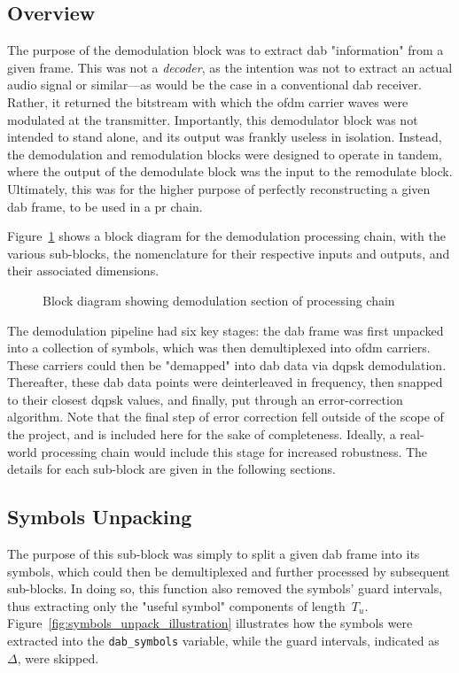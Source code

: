 \documentclass[class=report,11pt,crop=false]{standalone}
\begin{document}
\subsection{Overview}
The purpose of the demodulation block was to extract \gls{dab} "information" from a given frame. This was not a \emph{decoder}, as the intention was not to extract an actual audio signal or similar---as would be the case in a conventional \gls{dab} receiver. Rather, it returned the bitstream with which the \gls{ofdm} carrier waves were modulated at the transmitter. Importantly, this demodulator block was not intended to stand alone, and its output was frankly useless in isolation. Instead, the demodulation and remodulation blocks were designed to operate in tandem, where the output of the demodulate block was the input to the remodulate block. Ultimately, this was for the higher purpose of perfectly reconstructing a given \gls{dab} frame, to be used in a \gls{pr} chain.

Figure~\ref{fig:BD_Demod_All} shows a block diagram for the demodulation processing chain, with the various sub-blocks, the nomenclature for their respective inputs and outputs, and their associated dimensions.

\begin{figure}[htbp]
    \centering
    \captionsetup{type=figure}
    \def\svgwidth{\linewidth}
    { %
        }
    \caption{Block diagram showing demodulation section of processing chain}
    \label{fig:BD_Demod_All}
\end{figure}

The demodulation pipeline had six key stages: the \gls{dab} frame was first unpacked into a collection of symbols, which was then demultiplexed into \gls{ofdm} carriers. These carriers could then be "demapped" into \gls{dab} data via \gls{dqpsk} demodulation. Thereafter, these \gls{dab} data points were deinterleaved in frequency, then snapped to their closest \gls{dqpsk} values, and finally, put through an error-correction algorithm. Note that the final step of error correction fell outside of the scope of the project, and is included here for the sake of completeness. Ideally, a real-world processing chain would include this stage for increased robustness. The details for each sub-block are given in the following sections.

\subsection{Symbols Unpacking \label{subsect:dab-proc_symbols-unpack}}
The purpose of this sub-block was simply to split a given \gls{dab} frame into its symbols, which could then be demultiplexed and further processed by subsequent sub-blocks. In doing so, this function also removed the symbols' guard intervals, thus extracting only the "useful symbol" components of length~\(T_u\). Figure~\ref{fig:symbols_unpack_illustration} illustrates how the symbols were extracted into the \texttt{dab\_symbols} variable, while the guard intervals, indicated as \(\Delta\), were skipped.
\end{document}
